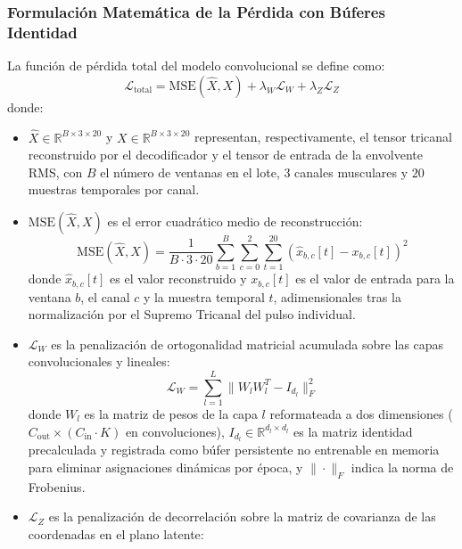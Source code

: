 \documentclass[11pt,a4paper]{article}
\begin{document}
\subsubsection{Formulación Matemática de la Pérdida con Búferes Identidad}
\label{subsubsec:perdida_conv_ortogonal}

La función de pérdida total del modelo convolucional se define como:
\begin{equation}
    \mathcal{L}_{\text{total}} = \text{MSE}(\hat{X}, X) + \lambda_W \mathcal{L}_W + \lambda_Z \mathcal{L}_Z
\end{equation}
donde:
\begin{itemize}
    \item $\hat{X} \in \mathbb{R}^{B \times 3 \times 20}$ y $X \in \mathbb{R}^{B \times 3 \times 20}$ representan, respectivamente, el tensor tricanal reconstruido por el decodificador y el tensor de entrada de la envolvente RMS, con $B$ el número de ventanas en el lote, $3$ canales musculares y $20$ muestras temporales por canal.
    \item $\text{MSE}(\hat{X}, X)$ es el error cuadrático medio de reconstrucción:
    \begin{equation}
        \text{MSE}(\hat{X}, X) = \frac{1}{B \cdot 3 \cdot 20} \sum_{b=1}^B \sum_{c=0}^2 \sum_{t=1}^{20} (\hat{x}_{b, c}[t] - x_{b, c}[t])^2
    \end{equation}
    donde $\hat{x}_{b, c}[t]$ es el valor reconstruido y $x_{b, c}[t]$ es el valor de entrada para la ventana $b$, el canal $c$ y la muestra temporal $t$, adimensionales tras la normalización por el Supremo Tricanal del pulso individual.
    \item $\mathcal{L}_W$ es la penalización de ortogonalidad matricial acumulada sobre las capas convolucionales y lineales:
    \begin{equation}
        \mathcal{L}_W = \sum_{l=1}^L \|W_l W_l^T - I_{d_l}\|_F^2
    \end{equation}
    donde $W_l$ es la matriz de pesos de la capa $l$ reformateada a dos dimensiones ($C_{\text{out}} \times (C_{\text{in}} \cdot K)$ en convoluciones), $I_{d_l} \in \mathbb{R}^{d_l \times d_l}$ es la matriz identidad precalculada y registrada como búfer persistente no entrenable en memoria para eliminar asignaciones dinámicas por época, y $\|\cdot\|_F$ indica la norma de Frobenius.
    \item $\mathcal{L}_Z$ es la penalización de decorrelación sobre la matriz de covarianza de las coordenadas en el plano latente:
    \begin{equation}

\end{equation}
\end{itemize}
\end{document}
